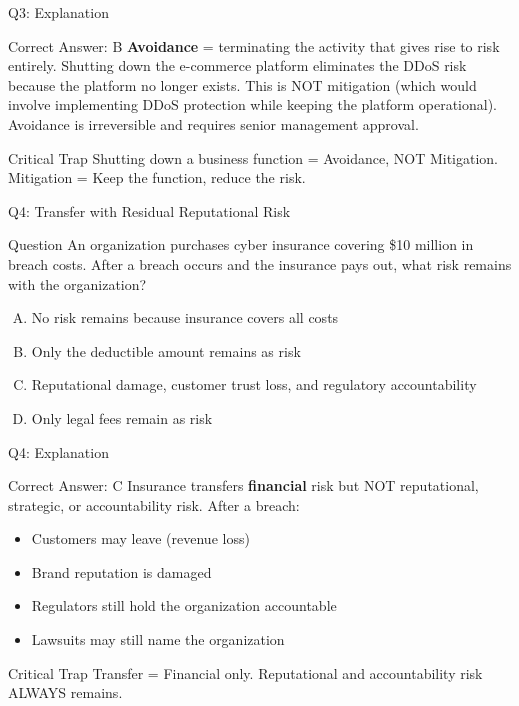 \documentclass{beamer}
\begin{document}
	\begin{frame}{Q3: Explanation}
		\begin{block}{Correct Answer: B}
			\textbf{Avoidance} = terminating the activity that gives rise to risk entirely. Shutting down the e-commerce platform eliminates the DDoS risk because the platform no longer exists. This is NOT mitigation (which would involve implementing DDoS protection while keeping the platform operational). Avoidance is irreversible and requires senior management approval.
		\end{block}
		\begin{alertblock}{Critical Trap}
			Shutting down a business function = Avoidance, NOT Mitigation.
			Mitigation = Keep the function, reduce the risk.
		\end{alertblock}
	\end{frame}
	
	\begin{frame}{Q4: Transfer with Residual Reputational Risk}
		\begin{block}{Question}
			An organization purchases cyber insurance covering \$10 million in breach costs. After a breach occurs and the insurance pays out, what risk remains with the organization?
		\end{block}
		\begin{enumerate}[(A)]
			\item No risk remains because insurance covers all costs
			\item Only the deductible amount remains as risk
			\item Reputational damage, customer trust loss, and regulatory accountability
			\item Only legal fees remain as risk
		\end{enumerate}
	\end{frame}
	
	\begin{frame}{Q4: Explanation}
		\begin{block}{Correct Answer: C}
			Insurance transfers \textbf{financial} risk but NOT reputational, strategic, or accountability risk. After a breach:
			\begin{itemize}
				\item Customers may leave (revenue loss)
				\item Brand reputation is damaged
				\item Regulators still hold the organization accountable
				\item Lawsuits may still name the organization
			\end{itemize}
		\end{block}
		\begin{alertblock}{Critical Trap}
			Transfer = Financial only. Reputational and accountability risk ALWAYS remains.
		\end{alertblock}
	\end{frame}
	
\end{document}
